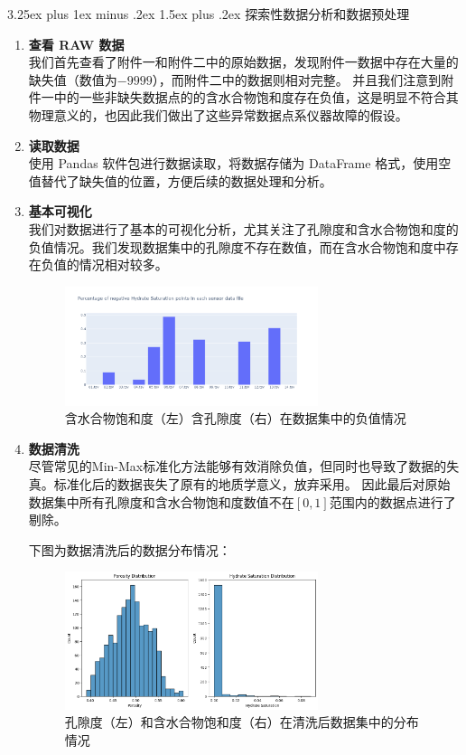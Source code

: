 \documentclass[12pt,a4paper]{nmmcm}
\makeatletter
\renewcommand\subsection{\@startsection{subsection}{2}{0pt}%
    {3.25ex plus 1ex minus .2ex}%
    {1.5ex plus .2ex}%
    {\normalfont\Large\bfseries}}
\makeatother
\begin{document}
\subsection{探索性数据分析和数据预处理}
\begin{enumerate}
  \item \textbf{查看 RAW 数据} \\
        我们首先查看了附件一和附件二中的原始数据，发现附件一数据中存在大量的缺失值（数值为$-9999$），而附件二中的数据则相对完整。
        并且我们注意到附件一中的一些非缺失数据点的的含水合物饱和度存在负值，这是明显不符合其物理意义的，也因此我们做出了这些异常数据点系仪器故障的假设。
  \item \textbf{读取数据} \\
        使用 Pandas 软件包进行数据读取，将数据存储为 DataFrame 格式，使用空值替代了缺失值的位置，方便后续的数据处理和分析。
  \item \textbf{基本可视化} \\
        我们对数据进行了基本的可视化分析，尤其关注了孔隙度和含水合物饱和度的负值情况。我们发现数据集中的孔隙度不存在数值，而在含水合物饱和度中存在负值的情况相对较多。
        \begin{figure}[H]
          \centering
          \includegraphics[width=0.7\textwidth]{figures/eda/1.png}
          \caption{含水合物饱和度（左）含孔隙度（右）在数据集中的负值情况}
        \end{figure}
  \item \textbf{数据清洗} \\
        尽管常见的Min-Max标准化方法能够有效消除负值，但同时也导致了数据的失真。标准化后的数据丧失了原有的地质学意义，放弃采用。
        因此最后对原始数据集中所有孔隙度和含水合物饱和度数值不在$[0, 1]$范围内的数据点进行了剔除。

        下图为数据清洗后的数据分布情况：
        \begin{figure}[H]
          \centering
          \includegraphics[width=0.7\textwidth]{figures/eda/2.png}
          \caption{孔隙度（左）和含水合物饱和度（右）在清洗后数据集中的分布情况}
        \end{figure}
\end{enumerate}
\end{document}

